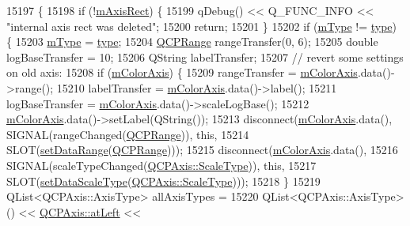 \begin{DoxyCode}
15197                                                 \{
15198   \textcolor{keywordflow}{if} (!\hyperlink{class_q_c_p_color_scale_a6e37f7d49cd614dc50ef1caae60461b9}{mAxisRect}) \{
15199     qDebug() << Q\_FUNC\_INFO << \textcolor{stringliteral}{"internal axis rect was deleted"};
15200     \textcolor{keywordflow}{return};
15201   \}
15202   \textcolor{keywordflow}{if} (\hyperlink{class_q_c_p_color_scale_a7d47ed4ab76f38e50164e9d77fe33789}{mType} != \hyperlink{class_q_c_p_color_scale_a9a5236328c97fbfde01e3d91c4fcce6a}{type}) \{
15203     \hyperlink{class_q_c_p_color_scale_a7d47ed4ab76f38e50164e9d77fe33789}{mType} = \hyperlink{class_q_c_p_color_scale_a9a5236328c97fbfde01e3d91c4fcce6a}{type};
15204     \hyperlink{class_q_c_p_range}{QCPRange} rangeTransfer(0, 6);
15205     \textcolor{keywordtype}{double} logBaseTransfer = 10;
15206     QString labelTransfer;
15207     \textcolor{comment}{// revert some settings on old axis:}
15208     \textcolor{keywordflow}{if} (\hyperlink{class_q_c_p_color_scale_a2efbc90fd31898fe05d2b74a8422b1d5}{mColorAxis}) \{
15209       rangeTransfer = \hyperlink{class_q_c_p_color_scale_a2efbc90fd31898fe05d2b74a8422b1d5}{mColorAxis}.data()->range();
15210       labelTransfer = \hyperlink{class_q_c_p_color_scale_a2efbc90fd31898fe05d2b74a8422b1d5}{mColorAxis}.data()->label();
15211       logBaseTransfer = \hyperlink{class_q_c_p_color_scale_a2efbc90fd31898fe05d2b74a8422b1d5}{mColorAxis}.data()->scaleLogBase();
15212       \hyperlink{class_q_c_p_color_scale_a2efbc90fd31898fe05d2b74a8422b1d5}{mColorAxis}.data()->setLabel(QString());
15213       disconnect(\hyperlink{class_q_c_p_color_scale_a2efbc90fd31898fe05d2b74a8422b1d5}{mColorAxis}.data(), SIGNAL(rangeChanged(\hyperlink{class_q_c_p_range}{QCPRange})), \textcolor{keyword}{this},
15214                  SLOT(\hyperlink{class_q_c_p_color_scale_abe88633003a26d1e756aa74984587fef}{setDataRange}(\hyperlink{class_q_c_p_range}{QCPRange})));
15215       disconnect(\hyperlink{class_q_c_p_color_scale_a2efbc90fd31898fe05d2b74a8422b1d5}{mColorAxis}.data(),
15216                  SIGNAL(scaleTypeChanged(\hyperlink{class_q_c_p_axis_a36d8e8658dbaa179bf2aeb973db2d6f0}{QCPAxis::ScaleType})), \textcolor{keyword}{this},
15217                  SLOT(\hyperlink{class_q_c_p_color_scale_aeb6107d67dd7325145b2498abae67fc3}{setDataScaleType}(\hyperlink{class_q_c_p_axis_a36d8e8658dbaa179bf2aeb973db2d6f0}{QCPAxis::ScaleType})));
15218     \}
15219     QList<QCPAxis::AxisType> allAxisTypes =
15220         QList<QCPAxis::AxisType>() << \hyperlink{class_q_c_p_axis_ae2bcc1728b382f10f064612b368bc18aaf84aa6cac6fb6099f54a2cbf7546b730}{QCPAxis::atLeft} << 

\end{DoxyCode}
